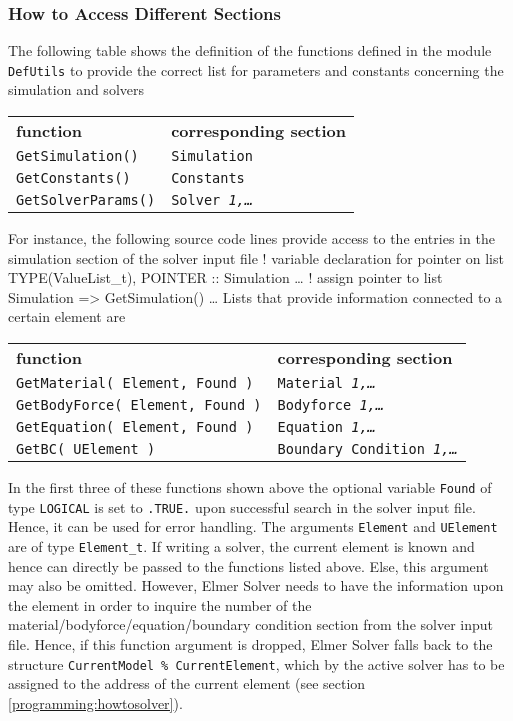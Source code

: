 \subsubsection{How to Access Different Sections}
The following table shows the definition of the functions defined in the module \texttt{DefUtils} to provide the correct list for parameters and constants concerning the simulation and solvers
\begin{center}
\begin{tabular}{l l}
\textbf{function} & \textbf{corresponding section}\\[2ex]
\texttt{GetSimulation()} & \texttt{Simulation} \\
\texttt{GetConstants()} & \texttt{Constants} \\
\texttt{GetSolverParams()} & \texttt{Solver \textit{1,\ldots}}
\end{tabular}
\end{center}
For instance, the following source code lines provide access to the entries in the simulation section of the solver input file
\ttbegin
! variable declaration for pointer on list
TYPE(ValueList_t), POINTER :: Simulation
\ldots
! assign pointer to list
Simulation => GetSimulation()
\ldots
\ttend
Lists that provide information connected to a certain element are
\begin{center}
\begin{tabular}{l l}
\textbf{function} & \textbf{corresponding section}\\ [2ex]
\texttt{GetMaterial(  Element, Found )} & \texttt{Material \textit{1,\ldots}} \\
\texttt{GetBodyForce( Element, Found )} & \texttt{Bodyforce \textit{1,\ldots}} \\
\texttt{GetEquation( Element, Found )} & \texttt{Equation \textit{1,\ldots}}\\
\texttt{GetBC( UElement )} & \texttt{Boundary Condition  \textit{1,\ldots}}\\
\end{tabular}
\end{center}
In the first three of these functions shown above the optional variable \texttt{Found} of type \texttt{LOGICAL} is set to \texttt{.TRUE.} upon successful search in the solver input file. Hence, it can be used for error handling. The arguments \texttt{Element} and \texttt{UElement} are of type \texttt{Element\_t}. If writing a solver, the current element is known and hence can directly be passed to the functions listed above. Else, this argument may also be omitted. However, Elmer Solver needs to have the information upon the element in order to inquire the number of the material/bodyforce/equation/boundary condition section from the solver input file. Hence, if this function argument is dropped, Elmer Solver falls back to the structure \texttt{CurrentModel \% CurrentElement}, which by the active solver has to be assigned to the address of the current element (see section \ref{programming:howtosolver}).

